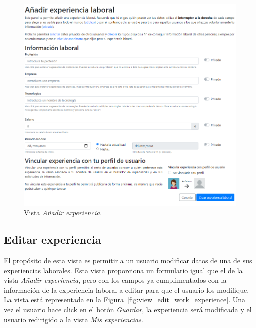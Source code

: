 \documentclass[a4paper, 12pt]{book}
\begin{document}
    \begin{figure}
        \centering
        \includegraphics[width=15cm, keepaspectratio]{img/create_we.PNG}
        \caption{Vista \emph{Añadir experiencia}.}\label{fig:view_add_work_experience}
    \end{figure}

    \subsection{Editar experiencia}
    \label{subsec:view_edit_work_experience}
    El propósito de esta vista es permitir a un usuario modificar datos de una de sus experiencias laborales.
    Esta vista proporciona un formulario igual que el de la vista \emph{Añadir experiencia}, pero con los campos ya cumplimentados con la información de la experiencia laboral a editar para que el usuario los modifique.
    La vista está representada en la Figura~\ref{fig:view_edit_work_experience}.
    Una vez el usuario hace click en el botón \emph{Guardar}, la experiencia será modificada y el usuario redirigido a la vista \emph{Mis experiencias}.
\end{document}
